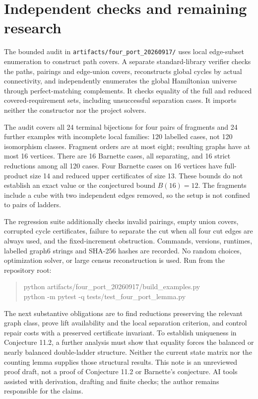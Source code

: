 \documentclass[10pt]{article}
\begin{document}
\section{Independent checks and remaining research}
The bounded audit in \texttt{artifacts/four\_port\_20260917/} uses local
edge-subset enumeration to construct path covers. A separate standard-library
verifier checks the paths, pairings and edge-union covers, reconstructs global
cycles by actual connectivity, and independently enumerates the global
Hamiltonian universe through perfect-matching complements. It checks equality
of the full and reduced covered-requirement sets, including unsuccessful
separation cases. It imports neither the constructor nor the project solvers.

The audit covers all 24 terminal bijections for four pairs of fragments and
24 further examples with incomplete local families: 120 labelled cases,
not 120 isomorphism classes. Fragment orders are at most eight; resulting
graphs have at most 16 vertices. There are 16 Barnette cases, all separating,
and 16 strict reductions among all 120 cases. Four Barnette cases on 16
vertices have full-product size 14 and reduced upper certificates of size 13.
These bounds do not establish an exact value or the conjectured bound
$B(16)=12$. The fragments include a cube with two independent edges removed,
so the setup is not confined to pairs of ladders.

The regression suite additionally checks invalid pairings, empty union
covers, corrupted cycle certificates, failure to separate the cut when all
four cut edges are always used, and the fixed-increment obstruction. Commands,
versions, runtimes, labelled graph6 strings and SHA-256 hashes are recorded.
No random choices, optimization solver, or large census reconstruction is used.
Run from the repository root:
\begin{quote}\small\ttfamily
python artifacts/four\_port\_20260917/build\_examples.py\\
python -m pytest -q tests/test\_four\_port\_lemma.py
\end{quote}

The next substantive obligations are to find reductions preserving the
relevant graph class, prove lift availability and the local separation
criterion, and control repair costs with a preserved certificate invariant.
To establish uniqueness in Conjecture 11.2, a further analysis must show that
equality forces the balanced or nearly balanced double-ladder structure.
Neither the current state matrix nor the counting lemma supplies those
structural results. This note is an unreviewed proof draft, not a proof of
Conjecture 11.2 or Barnette's conjecture. AI tools assisted with derivation,
drafting and finite checks; the author remains responsible for the claims.
\end{document}
